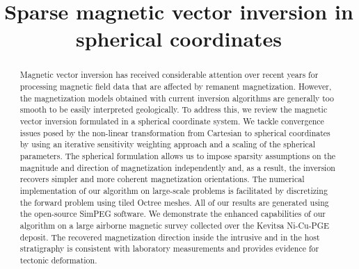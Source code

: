 \documentclass[paper]{geophysics}
\begin{document}
\title{Sparse magnetic vector inversion in spherical coordinates}

%
%
%
%
%



\begin{abstract}
Magnetic vector inversion has received considerable attention over recent years for processing magnetic field data that are affected by remanent magnetization. However, the magnetization models obtained with current inversion algorithms are generally too smooth to be easily interpreted geologically. To address this, we review the magnetic vector inversion formulated in a spherical coordinate system. We tackle convergence issues posed by the non-linear transformation from Cartesian to spherical coordinates by using an iterative sensitivity weighting approach and a scaling of the spherical parameters. The spherical formulation allows us to impose sparsity assumptions on the magnitude and direction of magnetization independently and, as a result, the inversion recovers simpler and more coherent magnetization orientations. The numerical implementation of our algorithm on large-scale problems is facilitated by discretizing the forward problem using tiled Octree meshes. All of our results are generated using the open-source SimPEG software. We demonstrate the enhanced capabilities of our algorithm on a large airborne magnetic survey collected over the Kevitsa Ni-Cu-PGE deposit. The recovered magnetization direction inside the intrusive and in the host stratigraphy is consistent with laboratory measurements and provides evidence for tectonic deformation.
\end{abstract}
\end{document}
